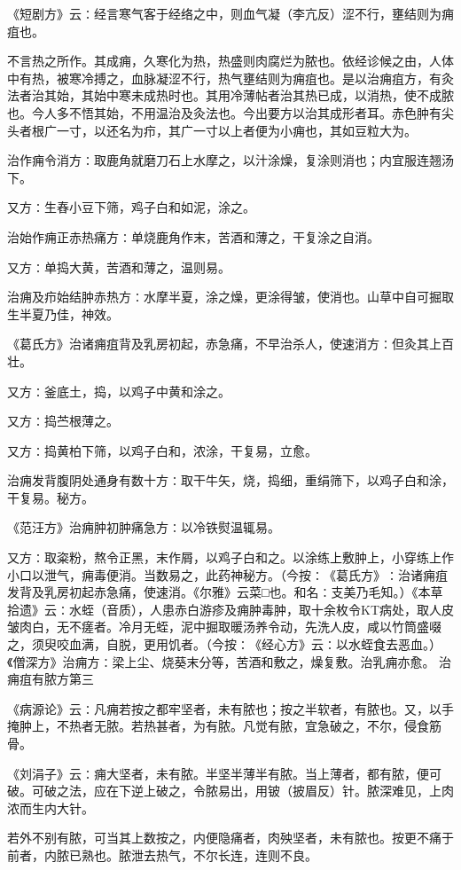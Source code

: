 \documentclass[a4paper,12pt,UTF8,twoside]{ctexbook}
\begin{document}
《短剧方》云∶经言寒气客于经络之中，则血气凝（李亢反）涩不行，壅结则为痈疽也。

不言热之所作。其成痈，久寒化为热，热盛则肉腐烂为脓也。依经诊候之由，人体中有热，被寒冷搏之，血脉凝涩不行，热气壅结则为痈疽也。是以治痈疽方，有灸法者治其始，其始中寒未成热时也。其用冷薄帖者治其热已成，以消热，使不成脓也。今人多不悟其始，不用温治及灸法也。今出要方以治其成形者耳。赤色肿有尖头者根广一寸，以还名为疖，其广一寸以上者便为小痈也，其如豆粒大为。

治作痈令消方∶取鹿角就磨刀石上水摩之，以汁涂燥，复涂则消也；内宜服连翘汤下。

又方∶生舂小豆下筛，鸡子白和如泥，涂之。

治始作痈正赤热痛方∶单烧鹿角作末，苦酒和薄之，干复涂之自消。

又方∶单捣大黄，苦酒和薄之，温则易。

治痈及疖始结肿赤热方∶水摩半夏，涂之燥，更涂得皱，使消也。山草中自可掘取生半夏乃佳，神效。

《葛氏方》治诸痈疽背及乳房初起，赤急痛，不早治杀人，使速消方∶但灸其上百壮。

又方∶釜底土，捣，以鸡子中黄和涂之。

又方∶捣苎根薄之。

又方∶捣黄柏下筛，以鸡子白和，浓涂，干复易，立愈。

治痈发背腹阴处通身有数十方∶取干牛矢，烧，捣细，重绢筛下，以鸡子白和涂，干复易。秘方。

《范汪方》治痈肿初肿痛急方∶以冷铁熨温辄易。

又方∶取粢粉，熬令正黑，末作屑，以鸡子白和之。以涂练上敷肿上，小穿练上作小口以泄气，痈毒便消。当数易之，此药神秘方。（今按∶《葛氏方》∶治诸痈疽发背及乳房初起赤急痛，使速消。《尔雅》云菜□也。和名∶支美乃毛知。）《本草拾遗》云∶水蛭（音质），人患赤白游疹及痈肿毒肿，取十余枚令KT病处，取人皮皱肉白，无不瘥者。冷月无蛭，泥中掘取暖汤养令动，先洗人皮，咸以竹筒盛啜之，须臾咬血满，自脱，更用饥者。（今按∶《经心方》云∶以水蛭食去恶血。）《僧深方》治痈方∶梁上尘、烧葵末分等，苦酒和敷之，燥复敷。治乳痈亦愈。
治痈疽有脓方第三

《病源论》云∶凡痈若按之都牢坚者，未有脓也；按之半软者，有脓也。又，以手掩肿上，不热者无脓。若热甚者，为有脓。凡觉有脓，宜急破之，不尔，侵食筋骨。

《刘涓子》云∶痈大坚者，未有脓。半坚半薄半有脓。当上薄者，都有脓，便可破。可破之法，应在下逆上破之，令脓易出，用铍（披眉反）针。脓深难见，上肉浓而生内大针。

若外不别有脓，可当其上数按之，内便隐痛者，肉殃坚者，未有脓也。按更不痛于前者，内脓已熟也。脓泄去热气，不尔长连，连则不良。
\end{document}
